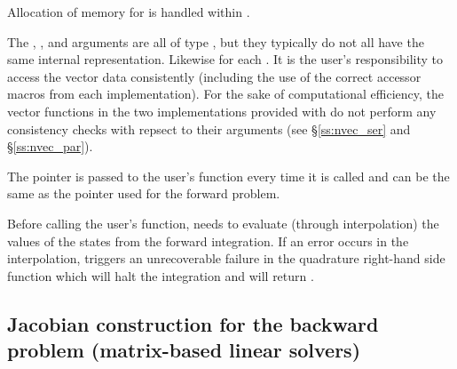 {
  Allocation of memory for  is handled within {\cvodes}.

  The , , and  arguments are all of type ,
  but they typically do not all have the same internal representation.
  Likewise for each .  It is the user's
  responsibility to access the vector data consistently (including the use of the
  correct accessor macros from each {\nvector} implementation). For the sake of
  computational efficiency, the vector functions in the two {\nvector} implementations
  provided with {\cvodes} do not perform any consistency checks with repsect to their
   arguments (see \S\ref{ss:nvec_ser} and \S\ref{ss:nvec_par}).

  The  pointer is passed to the user's  function every time
  it is called and can be the same as the  pointer used for the forward problem.

  {\warn}Before calling the user's  function, {\cvodes} needs to evaluate
  (through interpolation) the values of the states from the forward integration.
  If an error occurs in the interpolation, {\cvodes} triggers an unrecoverable
  failure in the quadrature right-hand side function which will halt the integration and
   will return .
}


\subsection{Jacobian construction for the backward problem (matrix-based linear solvers)}\label{ss:jacFn_b}


